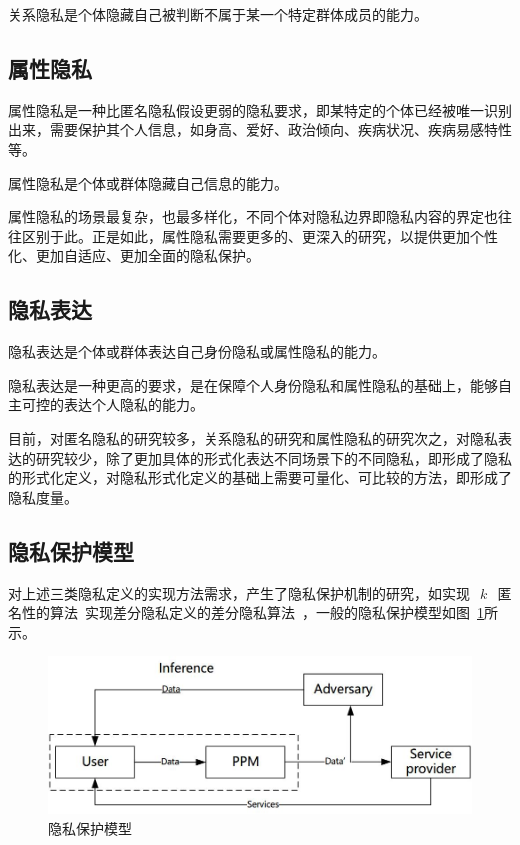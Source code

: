 \begin{definition}
	关系隐私是个体隐藏自己被判断不属于某一个特定群体成员的能力。
\end{definition}

\subsection{属性隐私}
属性隐私是一种比匿名隐私假设更弱的隐私要求，即某特定的个体已经被唯一识别出来，需要保护其个人信息，如身高、爱好、政治倾向、疾病状况、疾病易感特性等。

\begin{definition}
	属性隐私是个体或群体隐藏自己信息的能力。
\end{definition}

属性隐私的场景最复杂，也最多样化，不同个体对隐私边界即隐私内容的界定也往往区别于此。正是如此，属性隐私需要更多的、更深入的研究，以提供更加个性化、更加自适应、更加全面的隐私保护。

\subsection{隐私表达}

\begin{definition}
	隐私表达是个体或群体表达自己身份隐私或属性隐私的能力。
\end{definition}

隐私表达是一种更高的要求，是在保障个人身份隐私和属性隐私的基础上，能够自主可控的表达个人隐私的能力。

目前，对匿名隐私的研究较多，关系隐私的研究和属性隐私的研究次之，对隐私表达的研究较少，除了更加具体的形式化表达不同场景下的不同隐私，即形成了隐私的形式化定义，对隐私形式化定义的基础上需要可量化、可比较的方法，即形成了隐私度量。

\subsection{隐私保护模型}

对上述三类隐私定义的实现方法需求，产生了隐私保护机制的研究，如实现~$~k~$~匿名性的算法~\cite{sweeney2002k}实现差分隐私定义的差分隐私算法~\cite{dwork2006differential}，一般的隐私保护模型如图~\ref{fig:ppm-model}所示。

\begin{figure}[htbp]
	\centering
	\includegraphics[width = 0.6\linewidth]{./figures/cha1-ppm.jpg}
	\caption{隐私保护模型}
	\label{fig:ppm-model}
\end{figure}

